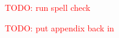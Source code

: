 \documentclass[12pt,twoside]{mitthesis}
\newcommand{\TODO}[1]{\textcolor{red}{TODO: #1}}
\begin{document}

\pagestyle{plain}

\TODO{run spell check}








\appendix
\TODO{put appendix back in}
% 
% 
% 
\begin{singlespace}
\printbibliography
\end{singlespace}
\end{document}
